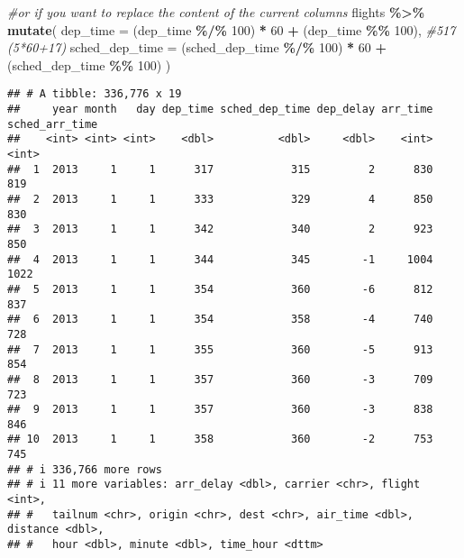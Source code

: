 \documentclass[
]{article}
\newenvironment{Shaded}{\begin{snugshade}}{\end{snugshade}}
\newcommand{\AttributeTok}[1]{\textcolor[rgb]{0.13,0.29,0.53}{#1}}
\newcommand{\CommentTok}[1]{\textcolor[rgb]{0.56,0.35,0.01}{\textit{#1}}}
\newcommand{\DecValTok}[1]{\textcolor[rgb]{0.00,0.00,0.81}{#1}}
\newcommand{\FunctionTok}[1]{\textcolor[rgb]{0.13,0.29,0.53}{\textbf{#1}}}
\newcommand{\NormalTok}[1]{#1}
\newcommand{\SpecialCharTok}[1]{\textcolor[rgb]{0.81,0.36,0.00}{\textbf{#1}}}
\begin{document}
\begin{Shaded}
\begin{Highlighting}[]
\CommentTok{\#or if you want to replace the content of the current columns}
\NormalTok{flights }\SpecialCharTok{\%\textgreater{}\%} \FunctionTok{mutate}\NormalTok{(}
                    \AttributeTok{dep\_time =}\NormalTok{ (dep\_time }\SpecialCharTok{\%/\%} \DecValTok{100}\NormalTok{) }\SpecialCharTok{*} \DecValTok{60} \SpecialCharTok{+}\NormalTok{ (dep\_time }\SpecialCharTok{\%\%} \DecValTok{100}\NormalTok{), }\CommentTok{\#517 (5*60+17)}
                    \AttributeTok{sched\_dep\_time =}\NormalTok{ (sched\_dep\_time }\SpecialCharTok{\%/\%} \DecValTok{100}\NormalTok{) }\SpecialCharTok{*} \DecValTok{60} \SpecialCharTok{+}\NormalTok{ (sched\_dep\_time }\SpecialCharTok{\%\%} \DecValTok{100}\NormalTok{)}
\NormalTok{                  )}
\end{Highlighting}
\end{Shaded}

\begin{verbatim}
## # A tibble: 336,776 x 19
##     year month   day dep_time sched_dep_time dep_delay arr_time sched_arr_time
##    <int> <int> <int>    <dbl>          <dbl>     <dbl>    <int>          <int>
##  1  2013     1     1      317            315         2      830            819
##  2  2013     1     1      333            329         4      850            830
##  3  2013     1     1      342            340         2      923            850
##  4  2013     1     1      344            345        -1     1004           1022
##  5  2013     1     1      354            360        -6      812            837
##  6  2013     1     1      354            358        -4      740            728
##  7  2013     1     1      355            360        -5      913            854
##  8  2013     1     1      357            360        -3      709            723
##  9  2013     1     1      357            360        -3      838            846
## 10  2013     1     1      358            360        -2      753            745
## # i 336,766 more rows
## # i 11 more variables: arr_delay <dbl>, carrier <chr>, flight <int>,
## #   tailnum <chr>, origin <chr>, dest <chr>, air_time <dbl>, distance <dbl>,
## #   hour <dbl>, minute <dbl>, time_hour <dttm>
\end{verbatim}
\end{document}
